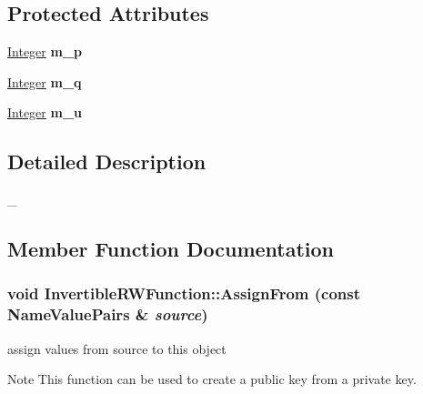 \subsection*{Protected Attributes}
\begin{DoxyCompactItemize}
\item 
\hypertarget{class_invertible_r_w_function_ab4a121ce0a3f24d29b88b08ed8fa275e}{
\hyperlink{class_integer}{Integer} {\bfseries m\_\-p}}
\label{class_invertible_r_w_function_ab4a121ce0a3f24d29b88b08ed8fa275e}

\item 
\hypertarget{class_invertible_r_w_function_a42013f81c5212a7d2072d2382018ae8d}{
\hyperlink{class_integer}{Integer} {\bfseries m\_\-q}}
\label{class_invertible_r_w_function_a42013f81c5212a7d2072d2382018ae8d}

\item 
\hypertarget{class_invertible_r_w_function_ae2afd7a6cc5342f098a858dde9161581}{
\hyperlink{class_integer}{Integer} {\bfseries m\_\-u}}
\label{class_invertible_r_w_function_ae2afd7a6cc5342f098a858dde9161581}

\end{DoxyCompactItemize}


\subsection{Detailed Description}
\_\- 

\subsection{Member Function Documentation}
\hypertarget{class_invertible_r_w_function_a56b0314b678c58228671d3c9049f86db}{
\subsubsection[{AssignFrom}]{\setlength{\rightskip}{0pt plus 5cm}void InvertibleRWFunction::AssignFrom (const {\bf NameValuePairs} \& {\em source})}}
\label{class_invertible_r_w_function_a56b0314b678c58228671d3c9049f86db}


assign values from source to this object \begin{DoxyNote}{Note}
This function can be used to create a public key from a private key. 
\end{DoxyNote}


